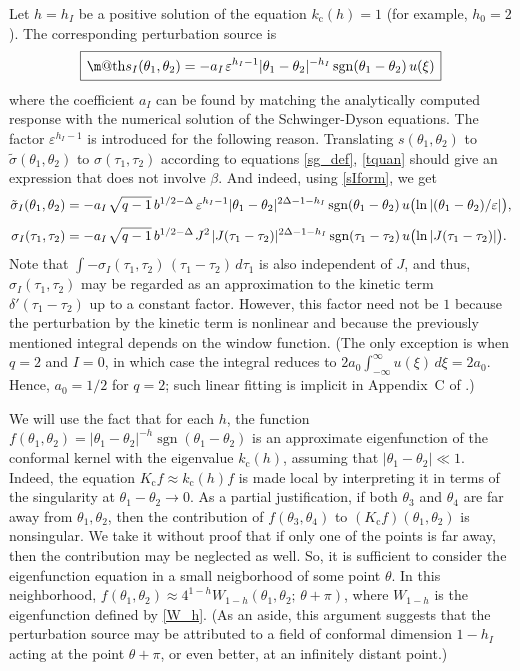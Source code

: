 \documentclass[12pt]{article}
\makeatletter
\newcommand*{\wideboxed}[1]{\setlength{\fboxsep}{1ex}%
  \fbox{\m@th$\displaystyle#1$}}
\DeclareMathOperator{\sgn}{sgn}
\newcommand{\cc}{\mathrm{c}}
\newcommand{\tsig}{\tilde{\sigma}}
\newcommand{\vep}{\varepsilon}
\makeatother
\begin{document}
Let $h=h_I$ be a positive solution of the equation $k_{\cc}(h)=1$ (for example, $h_0=2$). The corresponding perturbation source is
\begin{equation}\label{sIform}
\wideboxed{
s_{I}(\theta_1,\theta_2)
= -a_{I}\kern1pt \vep^{h_I-1}|\theta_1-\theta_2|^{-h_I}
\sgn(\theta_1-\theta_2)\,u(\xi)
}
\end{equation}
where the coefficient $a_I$ can be found by matching the analytically computed response with the numerical solution of the Schwinger-Dyson equations. The factor $\vep^{h_I-1}$ is introduced for the following reason. Translating $s(\theta_1,\theta_2)$ to $\tsig(\theta_1,\theta_2)$ to $\sigma(\tau_1,\tau_2)$ according to equations \eqref{sg_def}, \eqref{tquan} should give an expression that does not involve $\beta$. And indeed, using \eqref{sIform}, we get
\begin{align}
\label{tsigIform}
\tsig_{I}(\theta_1,\theta_2)
&=-a_{I}\kern1pt\sqrt{q-1}\,b^{1/2-\Delta}\,
\vep^{h_I-1}|\theta_1-\theta_2|^{2\Delta-1-h_I}\sgn(\theta_1-\theta_2)\,
u\bigl(\ln|(\theta_1-\theta_2)/\vep|\bigr),\\[6pt]
\sigma_{I}(\tau_1,\tau_2)
&=-a_{I}\kern1pt\sqrt{q-1}\,b^{1/2-\Delta}\kern1pt 
J^2\kern1pt|J(\tau_1-\tau_2)|^{2\Delta-1-h_I}\sgn(\tau_1-\tau_2)\,
u\bigl(\ln|J(\tau_1-\tau_2)|\bigr).
\end{align}
Note that $\int-\sigma_{I}(\tau_1,\tau_2)\,(\tau_1-\tau_2)\,d\tau_1$ is also independent of $J$, and thus, $\sigma_{I}(\tau_1,\tau_2)$ may be regarded as an approximation to the kinetic term $\delta'(\tau_1-\tau_2)$ up to a constant factor. However, this factor need not be $1$ because the perturbation by the kinetic term is nonlinear and because the previously mentioned integral depends on the window function. (The only exception is when $q=2$ and $I=0$, in which case the integral reduces to $2a_0\int_{-\infty}^{\infty}u(\xi)\,d\xi=2a_0$. Hence, $a_0=1/2$ for $q=2$; such linear fitting is implicit in Appendix~C of \cite{JeSuYo16}.)

We will use the fact that for each $h$, the function $f(\theta_1,\theta_2)=|\theta_1-\theta_2|^{-h}\sgn(\theta_1-\theta_2)$ is an approximate eigenfunction of the conformal kernel with the eigenvalue $k_{\cc}(h)$, assuming that ${|\theta_1-\theta_2|}\ll 1$. Indeed, the equation $K_{\cc}f\approx k_{\cc}(h)f$ is made local by interpreting it in terms of the  singularity at $\theta_1-\theta_2\to 0$. As a partial justification, if both $\theta_3$ and $\theta_4$ are far away from $\theta_1,\theta_2$, then the contribution of $f(\theta_3,\theta_4)$ to $(K_{\cc}f)(\theta_1,\theta_2)$ is nonsingular. We take it without proof that if only one of the points is far away, then the contribution may be neglected as well. So, it is sufficient to consider the eigenfunction equation in a small neigborhood of some point $\theta$. In this neighborhood, $f(\theta_1,\theta_2)\approx 4^{1-h}W_{1-h}(\theta_1,\theta_2;\,\theta+\pi)$, where $W_{1-h}$ is the eigenfunction defined by \eqref{W_h}. (As an aside, this argument suggests that the perturbation source may be attributed to a field of conformal dimension $1-h_I$ acting at the point $\theta+\pi$, or even better, at an infinitely distant point.)
\end{document}

